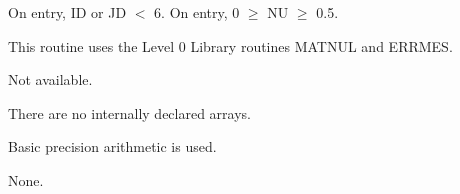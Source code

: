 \begin{indicators}
 On entry, ID or JD $\lt$ 6.
 On entry, 0 $\geq$ NU $\geq$ 0.5.
\end{indicators}
\begin{routines}
This routine uses the Level 0 Library routines MATNUL and ERRMES.
\end{routines}
\begin{timing}
Not available.
\end{timing}
\begin{storage}
There are no internally declared arrays.
\end{storage}
\begin{accuracy}
{{Basic precision}} arithmetic is used.
\end{accuracy}
\begin{comments}
None.
\end{comments}

